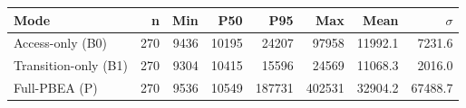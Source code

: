 \begin{tabular}{lrrrrrrr}
\toprule
Mode & n & Min & P50 & P95 & Max & Mean & $\sigma$ \\
\midrule
Access-only (B0) & 270 & 9436 & 10195 & 24207 & 97958 & 11992.1 & 7231.6 \\
Transition-only (B1) & 270 & 9304 & 10415 & 15596 & 24569 & 11068.3 & 2016.0 \\
Full-PBEA (P) & 270 & 9536 & 10549 & 187731 & 402531 & 32904.2 & 67488.7 \\
\bottomrule
\end{tabular}
